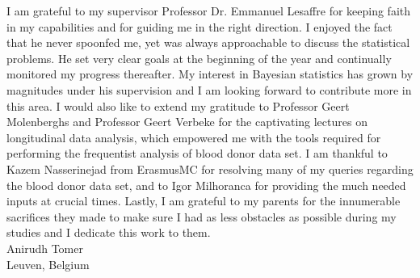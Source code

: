 I am grateful to my supervisor Professor Dr. Emmanuel Lesaffre for keeping faith in my capabilities and for guiding me in the right direction. I enjoyed the fact that he never spoonfed me, yet was always approachable to discuss the statistical problems. He set very clear goals at the beginning of the year and continually monitored my progress thereafter. My interest in Bayesian statistics has grown by magnitudes under his supervision and I am looking forward to contribute more in this area. I would also like to extend my gratitude to Professor Geert Molenberghs and Professor Geert Verbeke for the captivating lectures on longitudinal data analysis, which empowered me with the tools required for performing the frequentist analysis of blood donor data set. I am thankful to Kazem Nasserinejad from ErasmusMC for resolving many of my queries regarding the blood donor data set, and to Igor Milhoranca for providing the much needed inputs at crucial times. Lastly, I am grateful to my parents for the innumerable sacrifices they made to make sure I had as less obstacles as possible during my studies and I dedicate this work to them.\\

Anirudh Tomer\\
Leuven, Belgium